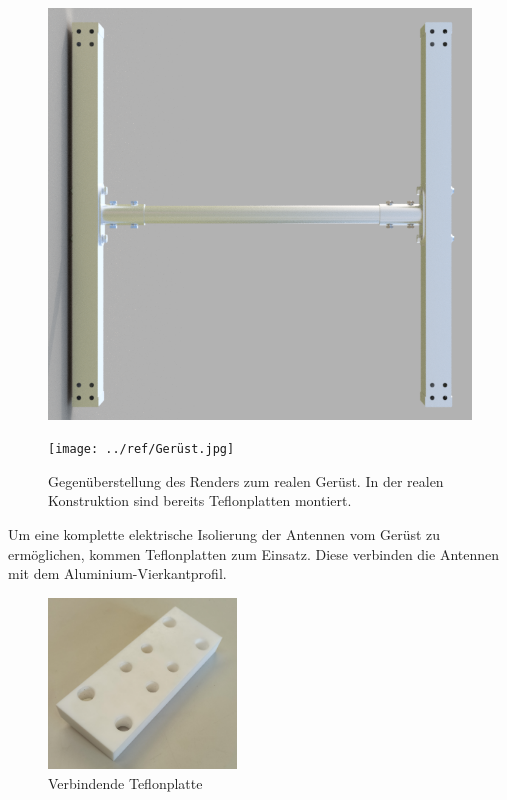 \begin{figure}[H]
	\begin{minipage}[b]{.4\linewidth} %
		\includegraphics[width=\linewidth]{../ref/0000-Gesamtbaugruppe_Rahmen.png}
		\label{fig:Gerüst-Zeichnung}
	\end{minipage}
	\hspace{.1\linewidth}%
	\begin{minipage}[b]{.4\linewidth} %
		\texttt{[image: ../ref/Gerüst.jpg]}
		\label{fig:Gerüst-real}
	\end{minipage}
	\caption{Gegenüberstellung des Renders zum realen Gerüst. In der realen Konstruktion sind bereits Teflonplatten montiert.}
\end{figure}

Um eine komplette elektrische Isolierung der Antennen vom Gerüst zu ermöglichen, kommen Teflonplatten zum Einsatz. Diese verbinden die Antennen mit dem Aluminium-Vierkantprofil.

\begin{figure}[H]
	\centering
	\includegraphics[width=5cm]{../ref/Teflon-Platte.jpg}
	\caption{Verbindende Teflonplatte}
	\label{fig:Teflonplatte}
\end{figure}

